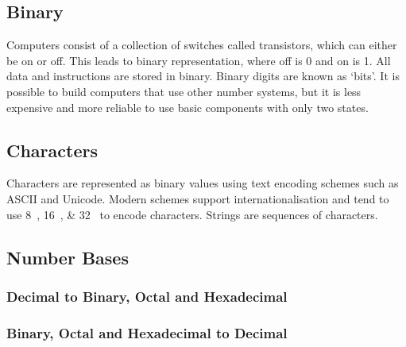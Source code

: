 \subsection{Binary}

Computers consist of a collection of switches called transistors, which can either be on or off.
This leads to binary representation, where off is \num{0} and on is \num{1}.
All data and instructions are stored in binary.
Binary digits are known as `bits'.
It is possible to build computers that use other number systems, but it is less expensive and more reliable to use basic components with only two states.

\subsection{Characters}

Characters are represented as binary values using text encoding schemes such as ASCII and Unicode.
Modern schemes support internationalisation and tend to use \SIlist[list-final-separator={ or }]{8;16;32}{\bit} to encode characters.
Strings are sequences of characters.

\subsection{Number Bases}

\subsubsection{Decimal to Binary, Octal and Hexadecimal}

\begin{center}
   \quad {} \quad {}
\end{center}

\subsubsection{Binary, Octal and Hexadecimal to Decimal}

\vspace{-\baselineskip}

